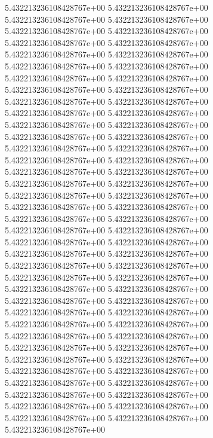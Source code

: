 5.432213236108428767e+00	5.432213236108428767e+00	5.432213236108428767e+00	5.432213236108428767e+00	5.432213236108428767e+00	5.432213236108428767e+00	5.432213236108428767e+00	5.432213236108428767e+00	5.432213236108428767e+00	5.432213236108428767e+00	5.432213236108428767e+00	5.432213236108428767e+00	5.432213236108428767e+00	5.432213236108428767e+00	5.432213236108428767e+00	5.432213236108428767e+00	5.432213236108428767e+00	5.432213236108428767e+00	5.432213236108428767e+00	5.432213236108428767e+00	5.432213236108428767e+00	5.432213236108428767e+00	5.432213236108428767e+00	5.432213236108428767e+00	5.432213236108428767e+00	5.432213236108428767e+00	5.432213236108428767e+00	5.432213236108428767e+00	5.432213236108428767e+00	5.432213236108428767e+00	5.432213236108428767e+00	5.432213236108428767e+00	5.432213236108428767e+00	5.432213236108428767e+00	5.432213236108428767e+00	5.432213236108428767e+00	5.432213236108428767e+00	5.432213236108428767e+00	5.432213236108428767e+00	5.432213236108428767e+00	5.432213236108428767e+00	5.432213236108428767e+00	5.432213236108428767e+00	5.432213236108428767e+00	5.432213236108428767e+00	5.432213236108428767e+00	5.432213236108428767e+00	5.432213236108428767e+00	5.432213236108428767e+00	5.432213236108428767e+00	5.432213236108428767e+00	5.432213236108428767e+00	5.432213236108428767e+00	5.432213236108428767e+00	5.432213236108428767e+00	5.432213236108428767e+00	5.432213236108428767e+00	5.432213236108428767e+00	5.432213236108428767e+00	5.432213236108428767e+00	5.432213236108428767e+00	5.432213236108428767e+00	5.432213236108428767e+00	5.432213236108428767e+00	5.432213236108428767e+00	5.432213236108428767e+00	5.432213236108428767e+00	5.432213236108428767e+00	5.432213236108428767e+00	5.432213236108428767e+00	5.432213236108428767e+00	5.432213236108428767e+00	5.432213236108428767e+00
